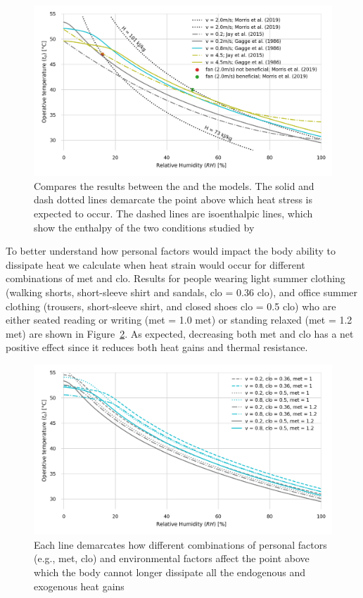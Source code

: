 \begin{figure}[thb!]
    \centering
    \includegraphics[width=\textwidth]{figures/comparison_air_speed.png}
    \caption{Compares the results between the  and the  models.
    The solid and dash dotted lines demarcate the point above which heat stress is expected to occur.
    The dashed lines are isoenthalpic lines, which show the enthalpy of the two conditions studied by }
    \label{fig:comparison_air_speed}
\end{figure}

To better understand how personal factors would impact the body ability to dissipate heat we calculate when heat strain would occur for different combinations of \ac{met} and \ac{clo}.
Results for people wearing light summer clothing (walking shorts, short-sleeve shirt and sandals, \acs{clo} = 0.36 clo), and office summer clothing (trousers, short-sleeve shirt, and closed shoes \acs{clo} = 0.5 clo) who are either seated reading or writing (\ac{met} = 1.0 met) or standing relaxed (\ac{met} = 1.2 met) are shown in Figure~\ref{fig:met_clo}.
As expected, decreasing both \ac{met} and \ac{clo} has a net positive effect since it reduces both heat gains and thermal resistance.

\begin{figure}[thb!]
    \centering
    \includegraphics[width=\textwidth]{figures/met_clo.png}
    \caption{Each line demarcates how different combinations of personal factors (e.g., \ac{met}, \ac{clo}) and environmental factors affect the point above which the body cannot longer dissipate all the endogenous and exogenous heat gains}
    \label{fig:met_clo}
\end{figure}

